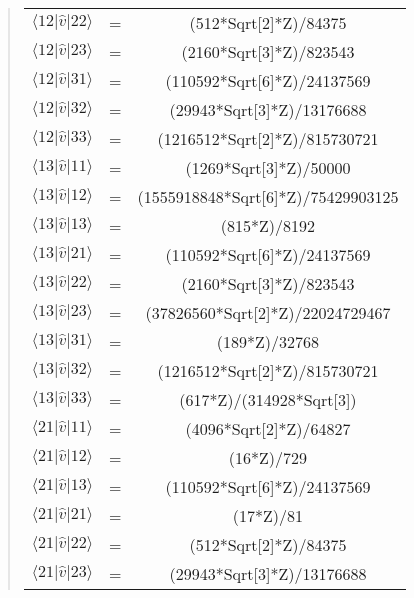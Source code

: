 \documentclass[%
oneside,                 %
final,                   %
10pt]{article}
\newenvironment{doconceexercise}{}{}
\begin{document}
\begin{doconceexercise}
\begin{quote}
\begin{tabular}{ccc}
$\langle 12\vert \hat{v} \vert 22\rangle$ & = & (512*Sqrt[2]*Z)/84375                  \\
$\langle 12\vert \hat{v} \vert 23\rangle$ & = & (2160*Sqrt[3]*Z)/823543                \\
$\langle 12\vert \hat{v} \vert 31\rangle$ & = & (110592*Sqrt[6]*Z)/24137569            \\
$\langle 12\vert \hat{v} \vert 32\rangle$ & = & (29943*Sqrt[3]*Z)/13176688             \\
$\langle 12\vert \hat{v} \vert 33\rangle$ & = & (1216512*Sqrt[2]*Z)/815730721          \\
$\langle 13\vert \hat{v} \vert 11\rangle$ & = & (1269*Sqrt[3]*Z)/50000                 \\
$\langle 13\vert \hat{v} \vert 12\rangle$ & = & (1555918848*Sqrt[6]*Z)/75429903125     \\
$\langle 13\vert \hat{v} \vert 13\rangle$ & = & (815*Z)/8192                           \\
$\langle 13\vert \hat{v} \vert 21\rangle$ & = & (110592*Sqrt[6]*Z)/24137569            \\
$\langle 13\vert \hat{v} \vert 22\rangle$ & = & (2160*Sqrt[3]*Z)/823543                \\
$\langle 13\vert \hat{v} \vert 23\rangle$ & = & (37826560*Sqrt[2]*Z)/22024729467       \\
$\langle 13\vert \hat{v} \vert 31\rangle$ & = & (189*Z)/32768                          \\
$\langle 13\vert \hat{v} \vert 32\rangle$ & = & (1216512*Sqrt[2]*Z)/815730721          \\
$\langle 13\vert \hat{v} \vert 33\rangle$ & = & (617*Z)/(314928*Sqrt[3])               \\
$\langle 21\vert \hat{v} \vert 11\rangle$ & = & (4096*Sqrt[2]*Z)/64827                 \\
$\langle 21\vert \hat{v} \vert 12\rangle$ & = & (16*Z)/729                             \\
$\langle 21\vert \hat{v} \vert 13\rangle$ & = & (110592*Sqrt[6]*Z)/24137569            \\
$\langle 21\vert \hat{v} \vert 21\rangle$ & = & (17*Z)/81                              \\
$\langle 21\vert \hat{v} \vert 22\rangle$ & = & (512*Sqrt[2]*Z)/84375                  \\
$\langle 21\vert \hat{v} \vert 23\rangle$ & = & (29943*Sqrt[3]*Z)/13176688             \\

\end{tabular}
\end{quote}
\end{doconceexercise}
\end{document}
